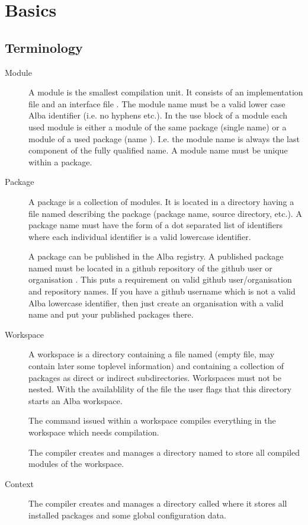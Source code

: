 \chapter{Basics}


\section{Terminology}

\begin{description}
\item[Module] A module is the smallest compilation unit. It consists of an
  implementation file  and an interface file
  . The module name must be a valid lower case Alba
  identifier (i.e. no hyphens etc.). In the use block of a module each used
  module is either a module of the same package (single name) or a module of a
  used package (name ). I.e. the module name is always the last
  component of the fully qualified name. A module name must be unique within a
  package.

\item[Package] A package is a collection of modules. It is located in a
  directory having a file named  describing the
  package (package name, source directory, etc.). A package name must have the
  form of a dot separated list of identifiers  where each
  individual identifier is a valid lowercase identifier.

  A package can be published in the Alba registry. A published package named
   must be located in a github repository  of the
  github user or organisation . This puts a requirement on valid
  github user/organisation and repository names. If you have a github username
  which is not a valid Alba lowercase identifier, then just create an
  organisation with a valid name and put your published packages there.

\item[Workspace] A workspace is a directory containing a file named
   (empty file, may contain later some toplevel
  information) and containing a collection of packages as direct or indirect
  subdirectories. Workspaces must not be nested. With the availablility of the
  file  the user flags that this directory starts an
  Alba workspace.

  The command  issued within a workspace compiles
  everything in the workspace which needs compilation.

  The compiler creates and manages a directory named  to
  store all compiled modules of the workspace.

\item[Context] The compiler creates and manages a directory called
   where it stores all installed packages and some global
  configuration data.

\end{description}


